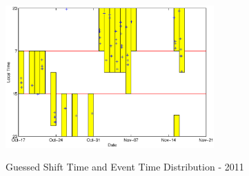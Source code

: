 \documentclass[a4paper,11pt]{article}
\begin{document}
\begin{figure}[htbp]
\begin{minipage}{1.0\hsize}
\begin{center}
\\
\end{center}
\end{minipage}
\begin{minipage}{1.0\hsize}
\begin{center}
\includegraphics[width =8cm]{PlotTime2011_4.eps}
\\
\caption{Guessed Shift Time and Event Time Distribution - 2011}
\end{center}
\end{minipage}
\end{figure}


 
\end{document}
